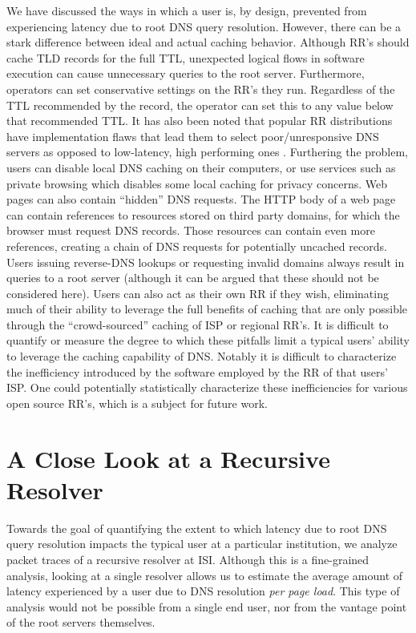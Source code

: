 \documentclass[sigconf,nonacm,10pt]{acmart}
\begin{document}
We have discussed the ways in which a user is, by design, prevented from
experiencing latency due to root DNS query resolution. However, there
can be a stark difference between ideal and actual caching behavior.
Although RR's should cache TLD records for the full TTL, unexpected
logical flows in software execution can cause unnecessary queries to the
root server. Furthermore, operators can set conservative settings on the
RR's they run. Regardless of the TTL recommended by the record, the
operator can set this to any value below that recommended TTL. It has
also been noted that popular RR distributions have implementation flaws
that lead them to select poor/unresponsive DNS servers as opposed to
low-latency, high performing ones \cite{yu2012authority}. \break
Furthering the problem, users can disable local DNS caching on their
computers, or use services such as private browsing which disables some
local caching for privacy concerns. Web pages can also contain
``hidden'' DNS requests. The HTTP body of a web page can contain
references to resources stored on third party domains, for which the
browser must request DNS records. Those resources can contain even more
references, creating a chain of DNS requests for potentially uncached
records. Users issuing reverse-DNS lookups or requesting invalid domains
always result in queries to a root server (although it can be argued
that these should not be considered here). Users can also act as their
own RR if they wish, eliminating much of their ability to leverage the
full benefits of caching that are only possible through the
``crowd-sourced'' caching of ISP or regional RR's. \break
It is difficult to quantify or measure the degree to which these
pitfalls limit a typical users' ability to leverage the caching
capability of DNS. Notably it is difficult to characterize the
inefficiency introduced by the software employed by the RR of that
users' ISP. One could potentially statistically characterize these
inefficiencies for various open source RR's, which is a subject for
future work.

\section{A Close Look at a Recursive
Resolver}\label{a-close-look-at-a-recursive-resolver-1}

Towards the goal of quantifying the extent to which latency due to root
DNS query resolution impacts the typical user at a particular
institution, we analyze packet traces of a recursive resolver at ISI.
Although this is a fine-grained analysis, looking at a single resolver
allows us to estimate the average amount of latency experienced by a
user due to DNS resolution \textit{per page load}. This type of analysis
would not be possible from a single end user, nor from the vantage point
of the root servers themselves.
\end{document}
